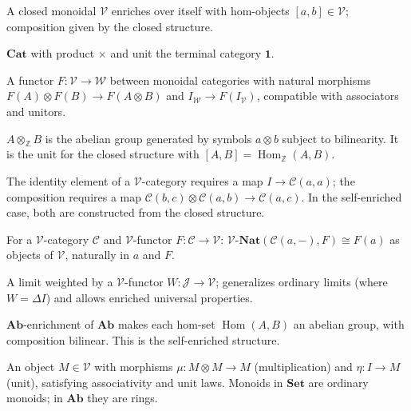 \begin{exercisesbox}
\begin{qa}
       {A closed monoidal $\mathcal{V}$ enriches over itself with hom-objects
        $[a,b] \in \mathcal{V}$; composition given by the closed structure.}

       {$\mathbf{Cat}$ with product $\times$ and unit the terminal category $\mathbf{1}$.}

       {A functor $F : \mathcal{V} \to \mathcal{W}$ between monoidal categories
        with natural morphisms $F(A)\otimes F(B) \to F(A\otimes B)$ and
        $I_\mathcal{W} \to F(I_\mathcal{V})$, compatible with associators and unitors.}

       {$A \otimes_\mathbb{Z} B$ is the abelian group generated by symbols $a\otimes b$
        subject to bilinearity. It is the unit for the closed structure with
        $[A,B] = \operatorname{Hom}_\mathbb{Z}(A,B)$.}

       {The identity element of a $\mathcal{V}$-category requires a map
        $I \to \mathcal{C}(a,a)$; the composition requires a map
        $\mathcal{C}(b,c)\otimes\mathcal{C}(a,b) \to \mathcal{C}(a,c)$.
        In the self-enriched case, both are constructed from the closed structure.}

       {For a $\mathcal{V}$-category $\mathcal{C}$ and $\mathcal{V}$-functor
        $F : \mathcal{C} \to \mathcal{V}$: $\mathcal{V}\text{-}\mathbf{Nat}(\mathcal{C}(a,-), F) \cong F(a)$
        as objects of $\mathcal{V}$, naturally in $a$ and $F$.}

       {A limit weighted by a $\mathcal{V}$-functor $W : \mathcal{J} \to \mathcal{V}$;
        generalizes ordinary limits (where $W = \Delta I$) and allows enriched
        universal properties.}

       {$\mathbf{Ab}$-enrichment of $\mathbf{Ab}$ makes each hom-set $\operatorname{Hom}(A,B)$
        an abelian group, with composition bilinear. This is the self-enriched structure.}

       {An object $M \in \mathcal{V}$ with morphisms $\mu : M \otimes M \to M$
        (multiplication) and $\eta : I \to M$ (unit), satisfying associativity
        and unit laws. Monoids in $\mathbf{Set}$ are ordinary monoids; in $\mathbf{Ab}$
        they are rings.}


\end{qa}
\end{exercisesbox}
